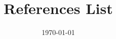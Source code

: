 \documentclass[a4paper,12pt]{article}
\begin{document}
\title{References List}
\author{}
\date{\today}
\maketitle

\nocite{*}


\end{document}
